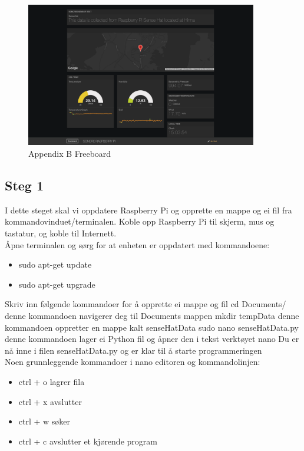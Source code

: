 \documentclass{article}
\begin{document}
\begin{appendices}
\begin{figure}[!ht]
  \centering
      \includegraphics[width=0.9\textwidth]{appendixb}
  \caption{Appendix B Freeboard}
\end{figure}


\subsection{Steg 1}
I dette steget skal vi oppdatere Raspberry Pi og opprette en mappe og ei fil fra kommandovinduet/terminalen.
Koble opp Raspberry Pi til skjerm, mus og tastatur, og koble til Internett.
\\
Åpne terminalen og sørg for at enheten er oppdatert med kommandoene:
\begin{itemize}
	\item sudo apt-get update
	\item sudo apt-get upgrade
\end{itemize}


Skriv inn følgende kommandoer for å opprette ei mappe og fil
cd Documents/ denne kommandoen navigerer deg til Documents mappen
mkdir tempData denne kommandoen oppretter en mappe kalt senseHatData
sudo nano senseHatData.py denne kommandoen lager ei Python fil og åpner den i tekst verktøyet nano
Du er nå inne i filen senseHatData.py og er klar til å starte programmeringen
\\
Noen grunnleggende kommandoer i nano editoren og kommandolinjen:
\begin{itemize}
	\item ctrl + o lagrer fila
	\item ctrl + x avslutter
	\item ctrl + w søker
	\item ctrl + c avslutter et kjørende program
\end{itemize}


\end{appendices}
\end{document}
